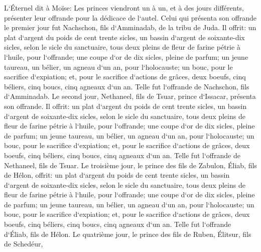 \verse L`Éternel dit à Moïse: Les princes viendront un à un, et à des jours différents, présenter leur offrande pour la dédicace de l`autel. 
\verse Celui qui présenta son offrande le premier jour fut Nachschon, fils d`Amminadab, de la tribu de Juda. 
\verse Il offrit: un plat d`argent du poids de cent trente sicles, un bassin d`argent de soixante-dix sicles, selon le sicle du sanctuaire, tous deux pleins de fleur de farine pétrie à l`huile, pour l`offrande; 
\verse une coupe d`or de dix sicles, pleine de parfum; 
\verse un jeune taureau, un bélier, un agneau d`un an, pour l`holocauste; 
\verse un bouc, pour le sacrifice d`expiation; 
\verse et, pour le sacrifice d`actions de grâces, deux boeufs, cinq béliers, cinq boucs, cinq agneaux d`un an. Telle fut l`offrande de Nachschon, fils d`Amminadab. 
\verse Le second jour, Nethaneel, fils de Tsuar, prince d`Issacar, présenta son offrande. 
\verse Il offrit: un plat d`argent du poids de cent trente sicles, un bassin d`argent de soixante-dix sicles, selon le sicle du sanctuaire, tous deux pleins de fleur de farine pétrie à l`huile, pour l`offrande; 
\verse une coupe d`or de dix sicles, pleine de parfum; 
\verse un jeune taureau, un bélier, un agneau d`un an, pour l`holocauste; 
\verse un bouc, pour le sacrifice d`expiation; 
\verse et, pour le sacrifice d`actions de grâces, deux boeufs, cinq béliers, cinq boucs, cinq agneaux d`un an. Telle fut l`offrande de Nethaneel, fils de Tsuar. 
\verse Le troisième jour, le prince des fils de Zabulon, Éliab, fils de Hélon, 
\verse offrit: un plat d`argent du poids de cent trente sicles, un bassin d`argent de soixante-dix sicles, selon le sicle du sanctuaire, tous deux pleins de fleur de farine pétrie à l`huile, pour l`offrande; 
\verse une coupe d`or de dix sicles, pleine de parfum; 
\verse un jeune taureau, un bélier, un agneau d`un an, pour l`holocauste; 
\verse un bouc, pour le sacrifice d`expiation; 
\verse et, pour le sacrifice d`actions de grâces, deux boeufs, cinq béliers, cinq boucs, cinq agneaux d`un an. Telle fut l`offrande d`Éliab, fils de Hélon. 
\verse Le quatrième jour, le prince des fils de Ruben, Élitsur, fils de Schedéur, 
